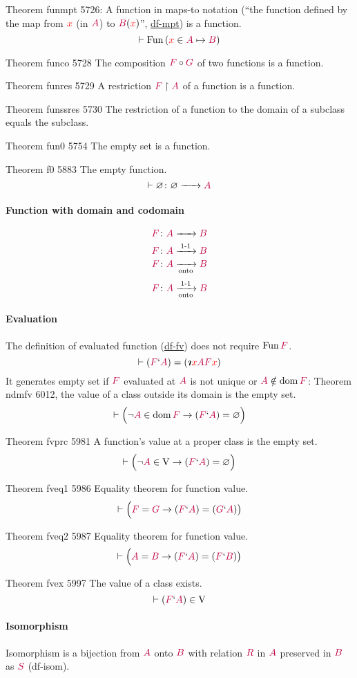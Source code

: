 \documentclass[12pt, letterpaper]{article}
\newcommand{\red}[1]{{\color{red} #1}}
\newcommand{\purple}[1]{{\color{purple} #1}}
\renewcommand{\emptyset}{\varnothing}
\newcommand{\provable}{\vdash}
\newcommand{\ra}{\rightarrow}
\newcommand{\setvar}{\red}
\newcommand{\classvar}{\purple}
\newcommand{\sx}{\setvar{x}}
\newcommand{\clA}{\classvar{A}}
\newcommand{\clB}{\classvar{B}}
\newcommand{\clF}{\classvar{F}}
\newcommand{\clG}{\classvar{G}}
\newcommand{\clR}{\classvar{R}}
\newcommand{\clS}{\classvar{S}}
\newcommand{\VV}{\mathrm{V}}
\newcommand{\rotiota}[2]{\rotatebox[origin=c]{180}{$#1\boldsymbol{\iota}$}}
\newcommand{\iiota}{{\mathpalette\rotiota\relax}}
\newcommand{\defdes}{\iiota}
\newcommand{\Fun}{{\operatorname{Fun}\,}}
\newcommand{\at}{`}
\newcommand{\mapinto}[3]{{#1}\colon{#2}\xrightarrow[]{\mathmakebox[1.5em]{}}{#3}}
\newcommand{\injmapinto}[3]{{#1}\colon{#2}\xrightarrow[]{\mathmakebox[1.5em]{\text{1-1}}}{#3}}
\newcommand{\maponto}[3]{{#1}\colon{#2}\xrightarrow[\text{onto}]{\mathmakebox[1.5em]{}}{#3}}
\newcommand{\bijmaponto}[3]{{#1}\colon{#2}\xrightarrow[\text{onto}]{\mathmakebox[1.5em]{\text{1-1}}}{#3}}
\newcommand{\dom}{{\operatorname{dom}\,}}
\theoremstyle{definition}
\theoremstyle{remark}
\theoremstyle{definition}
\theoremstyle{plain}
\begin{document}
	Theorem funmpt 5726: A function in maps-to notation (``the function defined by the map from $\sx$ (in $\clA$) to $\clB(\sx)$'',
	\href{http://us.metamath.org/mpeuni/df-mpt.html}{df-mpt})
	is a function.
	\[\provable\Fun(\sx\in\clA\mapsto\clB) \]
	
	Theorem	funco 5728	The composition $\clF\circ\clG$ of two functions is a function.
	
	Theorem	funres 5729	A restriction $\clF\restriction\clA$ of a function is a function. 
	
	Theorem	funssres 5730	The restriction of a function to the domain of a subclass equals the subclass.
	
	Theorem	fun0 5754	The empty set is a function. 
	
	Theorem	f0 5883	The empty function.
	\[\provable\mapinto{\emptyset}{\emptyset}{\clA} \]

	\paragraph{Function with domain and codomain}
	\[\mapinto{\clF}{\clA}{\clB} \]
	\[\injmapinto{\clF}{\clA}{\clB} \]
	\[\maponto{\clF}{\clA}{\clB} \]
	\[\bijmaponto{\clF}{\clA}{\clB} \]

	\paragraph{Evaluation}
	The definition of evaluated function
	(\href{http://us.metamath.org/mpeuni/df-fv.html}{df-fv}) does not require $\Fun\clF$.
	\[\provable (\clF\at\clA) = (\defdes\sx\clA\clF\sx)\]
	It generates empty set if $\clF$ evaluated at $\clA$ is not unique or 
	$\clA\notin\dom\clF$:
	Theorem	ndmfv 6012, the value of a class outside its domain is the empty set.
	\[\provable\Big( \neg \clA\in\dom\clF\ra(\clF\at\clA)=\emptyset\Big) \]
	
	Theorem	fvprc 5981	A function's value at a proper class is the empty set. 
	\[\provable\Big(\neg\clA\in\VV \ra (\clF\at\clA)=\emptyset\Big)
	\]
	
	Theorem	fveq1 5986	Equality theorem for function value.
	\[\provable\Big(\clF=\clG\ra(\clF\at\clA)=(\clG\at\clA)
	\big) \]
	
	Theorem	fveq2 5987	Equality theorem for function value.
	\[\provable\Big(\clA=\clB\ra(\clF\at\clA)=(\clF\at\clB)
	\big) \]	
	
	Theorem	fvex 5997	The value of a class exists.
	\[\provable (\clF\at\clA)\in\VV \]

	\paragraph{Isomorphism}
	Isomorphism is a bijection from $\clA$ onto $\clB$
	with relation $\clR$ in $\clA$ preserved in $\clB$ as $\clS$ (df-isom).
\end{document}
